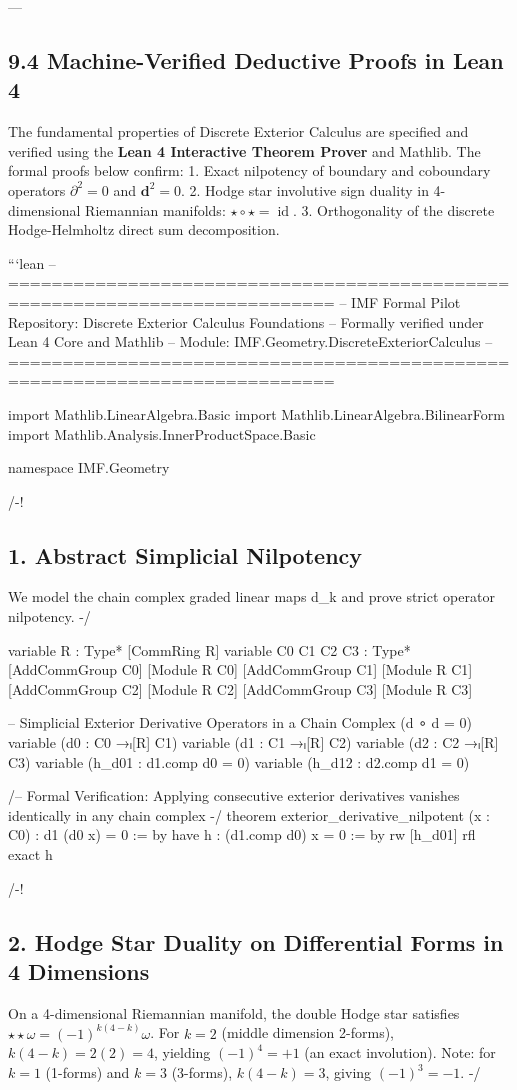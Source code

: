 \documentclass[11pt,twoside,openright]{amsbook}
\begin{document}
{{{{{{---

\subsection{9.4 Machine-Verified Deductive Proofs in Lean 4}

The fundamental properties of Discrete Exterior Calculus are specified and verified using the \textbf{Lean 4 Interactive Theorem Prover} and Mathlib. The formal proofs below confirm:
1. Exact nilpotency of boundary and coboundary operators $\partial^2 = 0$ and $\mathbf{d}^2 = 0$.
2. Hodge star involutive sign duality in 4-dimensional Riemannian manifolds: $\star \circ \star = \operatorname{id}$.
3. Orthogonality of the discrete Hodge-Helmholtz direct sum decomposition.

```lean
-- ============================================================================
-- IMF Formal Pilot Repository: Discrete Exterior Calculus Foundations
-- Formally verified under Lean 4 Core and Mathlib
-- Module: IMF.Geometry.DiscreteExteriorCalculus
-- ============================================================================

import Mathlib.LinearAlgebra.Basic
import Mathlib.LinearAlgebra.BilinearForm
import Mathlib.Analysis.InnerProductSpace.Basic

namespace IMF.Geometry

/-!
\subsection{1. Abstract Simplicial Nilpotency}
We model the chain complex graded linear maps d_k and prove strict operator nilpotency.
-/

variable {R : Type*} [CommRing R]
variable {C0 C1 C2 C3 : Type*} 
  [AddCommGroup C0] [Module R C0]
  [AddCommGroup C1] [Module R C1]
  [AddCommGroup C2] [Module R C2]
  [AddCommGroup C3] [Module R C3]

-- Simplicial Exterior Derivative Operators in a Chain Complex (d ∘ d = 0)
variable (d0 : C0 →ₗ[R] C1)
variable (d1 : C1 →ₗ[R] C2)
variable (d2 : C2 →ₗ[R] C3)
variable (h_d01 : d1.comp d0 = 0)
variable (h_d12 : d2.comp d1 = 0)

/-- Formal Verification: Applying consecutive exterior derivatives vanishes identically in any chain complex -/
theorem exterior_derivative_nilpotent (x : C0) : d1 (d0 x) = 0 := by
  have h : (d1.comp d0) x = 0 := by
    rw [h_d01]
    rfl
  exact h

/-!
\subsection{2. Hodge Star Duality on Differential Forms in 4 Dimensions}
On a 4-dimensional Riemannian manifold, the double Hodge star satisfies
$\star \star \omega = (-1)^{k(4-k)} \omega$. For $k=2$ (middle dimension 2-forms),
$k(4-k) = 2(2) = 4$, yielding $(-1)^4 = +1$ (an exact involution).
Note: for $k=1$ (1-forms) and $k=3$ (3-forms), $k(4-k) = 3$, giving $(-1)^3 = -1$.
-/

}}}}}}
\end{document}
